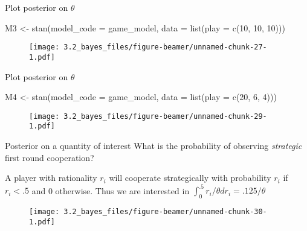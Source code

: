 \documentclass[
  11pt,
  ignorenonframetext,
]{beamer}
\newenvironment{Shaded}{\begin{snugshade}}{\end{snugshade}}
\newcommand{\AttributeTok}[1]{\textcolor[rgb]{0.40,0.45,0.13}{#1}}
\newcommand{\DecValTok}[1]{\textcolor[rgb]{0.68,0.00,0.00}{#1}}
\newcommand{\FunctionTok}[1]{\textcolor[rgb]{0.28,0.35,0.67}{#1}}
\newcommand{\NormalTok}[1]{\textcolor[rgb]{0.00,0.23,0.31}{#1}}
\newcommand{\OtherTok}[1]{\textcolor[rgb]{0.00,0.23,0.31}{#1}}
\begin{document}
\begin{frame}[fragile]{Plot posterior on \(\theta\)}
\protect\hypertarget{plot-posterior-on-theta}{}
\begin{Shaded}
\begin{Highlighting}[]
\NormalTok{M3 }\OtherTok{\textless{}{-}} \FunctionTok{stan}\NormalTok{(}\AttributeTok{model\_code =}\NormalTok{ game\_model, }\AttributeTok{data =} \FunctionTok{list}\NormalTok{(}\AttributeTok{play =} \FunctionTok{c}\NormalTok{(}\DecValTok{10}\NormalTok{,}
    \DecValTok{10}\NormalTok{, }\DecValTok{10}\NormalTok{)))}
\end{Highlighting}
\end{Shaded}

\begin{figure}

{\centering \texttt{[image: 3.2\_bayes\_files/figure-beamer/unnamed-chunk-27-1.pdf]}

}

\end{figure}
\end{frame}

\begin{frame}[fragile]{Plot posterior on \(\theta\)}
\protect\hypertarget{plot-posterior-on-theta-1}{}
\begin{Shaded}
\begin{Highlighting}[]
\NormalTok{M4 }\OtherTok{\textless{}{-}} \FunctionTok{stan}\NormalTok{(}\AttributeTok{model\_code =}\NormalTok{ game\_model, }\AttributeTok{data =} \FunctionTok{list}\NormalTok{(}\AttributeTok{play =} \FunctionTok{c}\NormalTok{(}\DecValTok{20}\NormalTok{,}
    \DecValTok{6}\NormalTok{, }\DecValTok{4}\NormalTok{)))}
\end{Highlighting}
\end{Shaded}

\begin{figure}

{\centering \texttt{[image: 3.2\_bayes\_files/figure-beamer/unnamed-chunk-29-1.pdf]}

}

\end{figure}
\end{frame}

\begin{frame}{Posterior on a quantity of interest}
\protect\hypertarget{posterior-on-a-quantity-of-interest}{}
What is the probability of observing \emph{strategic} first round
cooperation?

A player with rationality \(r_i\) will cooperate strategically with
probability \(r_i\) if \(r_i<.5\) and 0 otherwise. Thus we are
interested in \(\int_0^{.5}r_i/\theta dr_i = .125/\theta\)

\begin{figure}

{\centering \texttt{[image: 3.2\_bayes\_files/figure-beamer/unnamed-chunk-30-1.pdf]}

}

\end{figure}
\end{frame}
\end{document}
